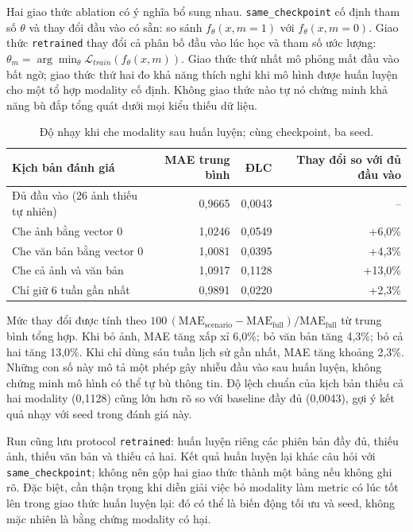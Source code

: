 \documentclass[12pt,a4paper,oneside]{article}
\begin{document}
Hai giao thức ablation có ý nghĩa bổ sung nhau. \texttt{same\_checkpoint} cố định tham số $\theta$ và thay đổi đầu vào có sẵn: so sánh $f_\theta(x,m=1)$ với $f_\theta(x,m=0)$. Giao thức \texttt{retrained} thay đổi cả phân bố đầu vào lúc học và tham số ước lượng: $\theta_m=\arg\min_\theta\mathcal{L}_{train}(f_\theta(x,m))$. Giao thức thứ nhất mô phỏng mất đầu vào bất ngờ; giao thức thứ hai đo khả năng thích nghi khi mô hình được huấn luyện cho một tổ hợp modality cố định. Không giao thức nào tự nó chứng minh khả năng bù đắp tổng quát dưới mọi kiểu thiếu dữ liệu.

\begin{table}[!htbp]
\centering
\small
\caption{Độ nhạy khi che modality sau huấn luyện; cùng checkpoint, ba seed.}
\label{tab:missing}
\begin{tabular}{lrrr}
\toprule
Kịch bản đánh giá & MAE trung bình & ĐLC & Thay đổi so với đủ đầu vào \\
\midrule
Đủ đầu vào (26 ảnh thiếu tự nhiên) & 0,9665 & 0,0043 & -- \\
Che ảnh bằng vector 0 & 1,0246 & 0,0549 & +6,0\% \\
Che văn bản bằng vector 0 & 1,0081 & 0,0395 & +4,3\% \\
Che cả ảnh và văn bản & 1,0917 & 0,1128 & +13,0\% \\
Chỉ giữ 6 tuần gần nhất & 0,9891 & 0,0220 & +2,3\% \\
\bottomrule
\end{tabular}
\end{table}

Mức thay đổi được tính theo $100\,(\mathrm{MAE}_{\mathrm{scenario}}-\mathrm{MAE}_{\mathrm{full}})/\mathrm{MAE}_{\mathrm{full}}$ từ trung bình tổng hợp. Khi bỏ ảnh, MAE tăng xấp xỉ 6,0\%; bỏ văn bản tăng 4,3\%; bỏ cả hai tăng 13,0\%. Khi chỉ dùng sáu tuần lịch sử gần nhất, MAE tăng khoảng 2,3\%. Những con số này mô tả một phép gây nhiễu đầu vào sau huấn luyện, không chứng minh mô hình có thể tự bù thông tin. Độ lệch chuẩn của kịch bản thiếu cả hai modality (0,1128) cũng lớn hơn rõ so với baseline đầy đủ (0,0043), gợi ý kết quả nhạy với seed trong đánh giá này.


Run cũng lưu protocol \texttt{retrained}: huấn luyện riêng các phiên bản đầy đủ, thiếu ảnh, thiếu văn bản và thiếu cả hai. Kết quả huấn luyện lại khác câu hỏi với \texttt{same\_checkpoint}; không nên gộp hai giao thức thành một bảng nếu không ghi rõ. Đặc biệt, cần thận trọng khi diễn giải việc bỏ modality làm metric có lúc tốt lên trong giao thức huấn luyện lại: đó có thể là biến động tối ưu và seed, không mặc nhiên là bằng chứng modality có hại.
\end{document}
